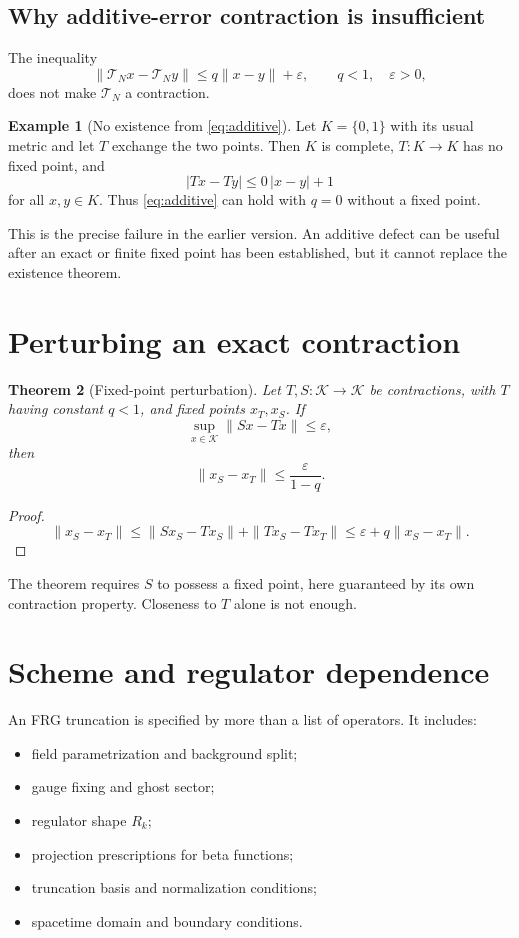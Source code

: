 \documentclass[11pt]{article}
\newtheorem{theorem}{Theorem}[section]
\theoremstyle{definition}
\newtheorem{example}[theorem]{Example}
\theoremstyle{remark}
\newcommand{\Kset}{\mathcal K}
\newcommand{\TN}{\mathcal T_N}
\begin{document}
\subsection{Why additive-error contraction is insufficient}

The inequality
\begin{equation}
 \|\TN x-\TN y\|
 \leq q\|x-y\|+\varepsilon,
 \qquad q<1,\quad\varepsilon>0,
 \label{eq:additive}
\end{equation}
does not make \(\TN\) a contraction.

\begin{example}[No existence from \eqref{eq:additive}]
Let \(K=\{0,1\}\) with its usual metric and let \(T\) exchange the two
points. Then \(K\) is complete, \(T:K\to K\) has no fixed point, and
\[
 |Tx-Ty|\leq0\,|x-y|+1
\]
for all \(x,y\in K\). Thus \eqref{eq:additive} can hold with \(q=0\)
without a fixed point.
\end{example}

This is the precise failure in the earlier version. An additive defect can
be useful after an exact or finite fixed point has been established, but it
cannot replace the existence theorem.

\section{Perturbing an exact contraction}

\begin{theorem}[Fixed-point perturbation]
\label{thm:perturbation}
Let \(T,S:\Kset\to\Kset\) be contractions, with \(T\) having constant
\(q<1\), and fixed points \(x_T,x_S\). If
\[
 \sup_{x\in\Kset}\|Sx-Tx\|\leq\varepsilon,
\]
then
\[
 \|x_S-x_T\|\leq\frac{\varepsilon}{1-q}.
\]
\end{theorem}

\begin{proof}
\[
 \|x_S-x_T\|
 \leq\|Sx_S-Tx_S\|+\|Tx_S-Tx_T\|
 \leq\varepsilon+q\|x_S-x_T\|.
\]
\end{proof}

The theorem requires \(S\) to possess a fixed point, here guaranteed by its
own contraction property. Closeness to \(T\) alone is not enough.

\section{Scheme and regulator dependence}

An FRG truncation is specified by more than a list of operators. It includes:
\begin{itemize}
\item field parametrization and background split;
\item gauge fixing and ghost sector;
\item regulator shape \(R_k\);
\item projection prescriptions for beta functions;
\item truncation basis and normalization conditions;
\item spacetime domain and boundary conditions.
\end{itemize}
\end{document}
